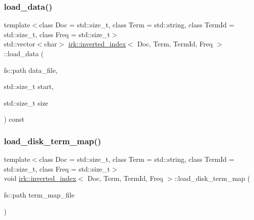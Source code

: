 \mbox{\label{classirk_1_1inverted__index_a66e54902ec83c229af58f1f6b443ed0d}} 
\subsubsection{\texorpdfstring{load\+\_\+data()}{load\_data()}\hspace{0.1cm}{\footnotesize\ttfamily [2/2]}}
{\footnotesize\ttfamily template$<$class Doc  = std\+::size\+\_\+t, class Term  = std\+::string, class Term\+Id  = std\+::size\+\_\+t, class Freq  = std\+::size\+\_\+t$>$ \\
std\+::vector$<$char$>$ \mbox{\hyperlink{classirk_1_1inverted__index}{irk\+::inverted\+\_\+index}}$<$ Doc, Term, Term\+Id, Freq $>$\+::load\+\_\+data (\begin{DoxyParamCaption}\item[{fs\+::path}]{data\+\_\+file,  }\item[{std\+::size\+\_\+t}]{start,  }\item[{std\+::size\+\_\+t}]{size }\end{DoxyParamCaption}) const\hspace{0.3cm}{\ttfamily [inline]}}

\mbox{\label{classirk_1_1inverted__index_ad52c3a74f65778de12778dffb3306b62}} 
\subsubsection{\texorpdfstring{load\+\_\+disk\+\_\+term\+\_\+map()}{load\_disk\_term\_map()}}
{\footnotesize\ttfamily template$<$class Doc  = std\+::size\+\_\+t, class Term  = std\+::string, class Term\+Id  = std\+::size\+\_\+t, class Freq  = std\+::size\+\_\+t$>$ \\
void \mbox{\hyperlink{classirk_1_1inverted__index}{irk\+::inverted\+\_\+index}}$<$ Doc, Term, Term\+Id, Freq $>$\+::load\+\_\+disk\+\_\+term\+\_\+map (\begin{DoxyParamCaption}\item[{fs\+::path}]{term\+\_\+map\+\_\+file }\end{DoxyParamCaption})\hspace{0.3cm}{\ttfamily [inline]}}

